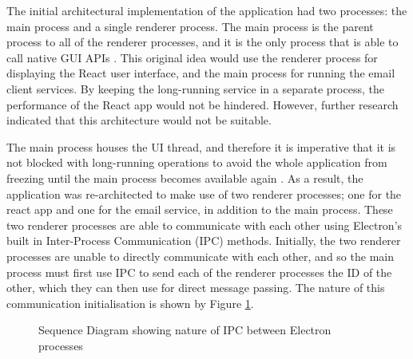 The initial architectural implementation of the application had two processes: the main process and a single renderer process. The main process is the parent process to all of the renderer processes, and it is the only process that is able to call native GUI APIs \cite{electron-architecture}. This original idea would use the renderer process for displaying the React user interface, and the main process for running the email client services. By keeping the long-running service in a separate process, the performance of the React app would not be hindered. However, further research indicated that this architecture would not be suitable.

The main process houses the UI thread, and therefore it is imperative that it is not blocked with long-running operations to avoid the whole application from freezing until the main process becomes available again \cite{electron-performance}. As a result, the application was re-architected to make use of two renderer processes; one for the react app and one for the email service, in addition to the main process. These two renderer processes are able to communicate with each other using Electron's built in Inter-Process Communication (IPC) methods. Initially, the two renderer processes are unable to directly communicate with each other, and so the main process must first use IPC to send each of the renderer processes the ID of the other, which they can then use for direct message passing. The nature of this communication initialisation is shown by Figure \ref{fig:sequence-ipc}.

\begin{figure}[h!]
\begin{center}
  \caption{Sequence Diagram showing nature of IPC between Electron processes}
  \label{fig:sequence-ipc}
\end{center}
\end{figure}


